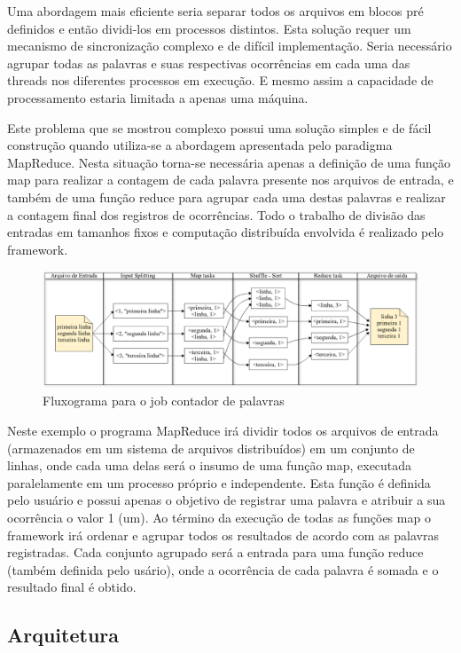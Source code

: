 Uma abordagem mais eficiente seria separar todos os arquivos em blocos pré definidos e então dividi-los em processos distintos. Esta solução requer um mecanismo de sincronização complexo e de difícil implementação. Seria necessário agrupar todas as palavras e suas respectivas ocorrências em cada uma das threads nos diferentes processos em execução. E mesmo assim a capacidade de processamento estaria limitada a apenas uma máquina.

Este problema que se mostrou complexo possui uma solução simples e de fácil construção quando utiliza-se a abordagem apresentada pelo paradigma MapReduce. Nesta situação torna-se necessária apenas a definição de uma função map para realizar a contagem de cada palavra presente nos arquivos de entrada, e também de uma função reduce para agrupar cada uma destas palavras e realizar a contagem final dos registros de ocorrências. Todo o trabalho de divisão das entradas em tamanhos fixos e computação distribuída envolvida é realizado pelo framework.

\begin{figure}[h!]
	\centering
	\includegraphics[keepaspectratio=true,scale=0.45]
	  {figuras/mapreduce-word-count.eps}
	\caption{Fluxograma para o job contador de palavras}
	\label{fig-mapreduce-word-count}
\end{figure}

Neste exemplo o programa MapReduce irá dividir todos os arquivos de entrada (armazenados em um sistema de arquivos distribuídos) em um conjunto de linhas, onde cada uma delas será o insumo de uma função map, executada paralelamente em um processo próprio e independente. Esta função é definida pelo usuário e possui apenas o objetivo de registrar uma palavra e atribuir a sua ocorrência o valor 1 (um). Ao término da execução de todas as funções map o framework irá ordenar e agrupar todos os resultados de acordo com as palavras registradas. Cada conjunto agrupado será a entrada para uma função reduce (também definida pelo usário), onde a ocorrência de cada palavra é somada e o resultado final é obtido.

\subsection{Arquitetura}

